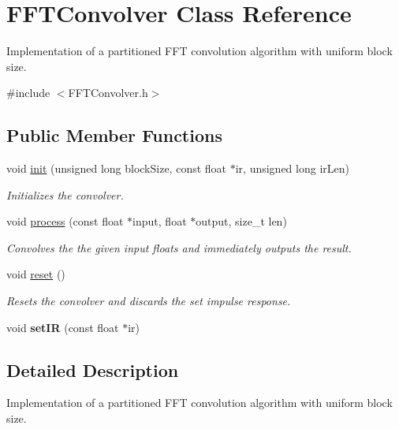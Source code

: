 \hypertarget{class_f_f_t_convolver}{}\section{F\+F\+T\+Convolver Class Reference}
\label{class_f_f_t_convolver}


Implementation of a partitioned F\+FT convolution algorithm with uniform block size.  




{\ttfamily \#include $<$F\+F\+T\+Convolver.\+h$>$}

\subsection*{Public Member Functions}
\begin{DoxyCompactItemize}
\item 
void \hyperlink{class_f_f_t_convolver_a7cd43a369a1c2064c2e360d11287f41b}{init} (unsigned long block\+Size, const float $\ast$ir, unsigned long ir\+Len)
\begin{DoxyCompactList}\small\item\em Initializes the convolver. \end{DoxyCompactList}\item 
void \hyperlink{class_f_f_t_convolver_a31b560596aea14e50ad48bde70571665}{process} (const float $\ast$input, float $\ast$output, size\+\_\+t len)
\begin{DoxyCompactList}\small\item\em Convolves the the given input floats and immediately outputs the result. \end{DoxyCompactList}\item 
\mbox{\label{class_f_f_t_convolver_a31e77811a5c845d3639a0c41634eb792}} 
void \hyperlink{class_f_f_t_convolver_a31e77811a5c845d3639a0c41634eb792}{reset} ()
\begin{DoxyCompactList}\small\item\em Resets the convolver and discards the set impulse response. \end{DoxyCompactList}\item 
\mbox{\label{class_f_f_t_convolver_ac7cb580fadccfcdbeca7a7fd81817245}} 
void {\bfseries set\+IR} (const float $\ast$ir)
\end{DoxyCompactItemize}


\subsection{Detailed Description}
Implementation of a partitioned F\+FT convolution algorithm with uniform block size. 


